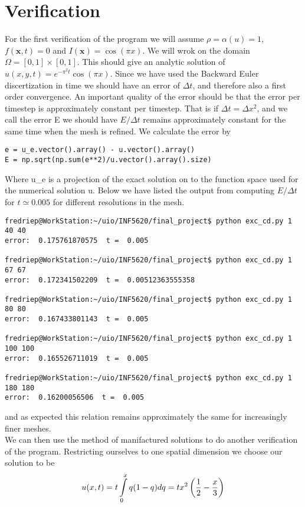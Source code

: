 \documentclass[a4paper,english, 10pt, twoside]{article}
\begin{document}
\section{Verification}
For the first verification of the program we will assume $\rho = \alpha(u) = 1$, $f(\mathbf{x},t) = 0$ and $I(\mathbf{x}) = \cos(\pi x)$. We 
will wrok on the domain $\Omega = [0,1]\times[0,1]$. This should give an analytic solution of $u(x,y,t) = e^{-\pi^2t}\cos(\pi x)$. Since we have used 
the Backward Euler discertization in time we should have an error of $\Delta t$, and therefore also a first order convergence. An important 
quality of the error should be that the error per timestep is approximately constant per timestep. That is if $\Delta t = \Delta x^2$, and 
we call the error E we should have $E/\Delta t$ remains approximately constant for the same time when the mesh is refined. We calculate the 
error by
\begin{lstlisting}
e = u_e.vector().array() - u.vector().array()
E = np.sqrt(np.sum(e**2)/u.vector().array().size)
\end{lstlisting}
Where u\_e is a projection of the exact solution on to the function space used for the numerical solution u. Below we have listed the output 
from computing $E/\Delta t$ for $t\simeq0.005$ for different resolutions in the mesh.
\begin{lstlisting}
fredriep@WorkStation:~/uio/INF5620/final_project$ python exc_cd.py 1 40 40
error:  0.175761870575  t =  0.005

fredriep@WorkStation:~/uio/INF5620/final_project$ python exc_cd.py 1 67 67
error:  0.172341502209  t =  0.00512363555358

fredriep@WorkStation:~/uio/INF5620/final_project$ python exc_cd.py 1 80 80
error:  0.167433801143  t =  0.005

fredriep@WorkStation:~/uio/INF5620/final_project$ python exc_cd.py 1 100 100
error:  0.165526711019  t =  0.005

fredriep@WorkStation:~/uio/INF5620/final_project$ python exc_cd.py 1 180 180
error:  0.16200056506  t =  0.005
\end{lstlisting}
and as expected this relation remains approximately the same for increasingly finer meshes.\\
We can then use the method of manifactured solutions to do another verification of the program. Restricting ourselves to one spatial dimension we 
choose our solution to be 
\begin{equation}
 u(x,t) = t\int\limits_0^xq(1-q)dq = tx^2\left({1\over2}-{x\over3}\right)
\end{equation}
\end{document}
